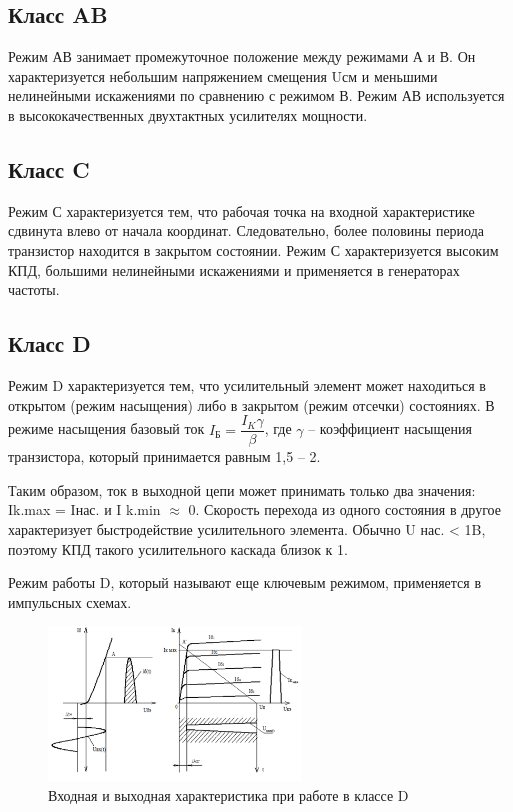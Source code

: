 \documentclass[unicode, 12pt, a4paper, oneside]{article}
\begin{document}
\subsection*{Класс AB}

Режим АВ занимает промежуточное положение между режимами А и В. Он характеризуется небольшим напряжением смещения Uсм и меньшими нелинейными искажениями по сравнению с режимом В. Режим АВ используется в высококачественных двухтактных усилителях мощности.

\subsection*{Класс C}

Режим С характеризуется тем, что рабочая точка на входной характеристике сдвинута влево от начала координат. Следовательно, более половины периода транзистор находится в закрытом состоянии. Режим С характеризуется высоким КПД, большими нелинейными искажениями и применяется в генераторах частоты.

\subsection*{Класс D}

Режим D характеризуется тем, что усилительный элемент может находиться в открытом  (режим насыщения) либо в закрытом (режим отсечки) состояниях. В режиме насыщения базовый ток $I_\text{Б} = \dfrac{I_K\gamma}{\beta}$, где $\gamma$ – коэффициент насыщения транзистора, который принимается равным 1,5 – 2.

Таким образом, ток в выходной цепи может принимать только два значения: Ik.max = Iнас. и I k.min $\approx$ 0. Скорость перехода из одного состояния в другое характеризует быстродействие усилительного элемента. Обычно U нас. < 1B, поэтому КПД такого усилительного каскада близок к 1.

Режим работы D, который называют еще ключевым режимом, применяется в импульсных схемах.

\begin{figure}[H]
\centering
\includegraphics[width=0.6\textwidth]{20_GAD.png}
\caption{Входная и выходная характеристика при работе в классе D}
\label{fig:20_GAD}
\end{figure}
\end{document}
